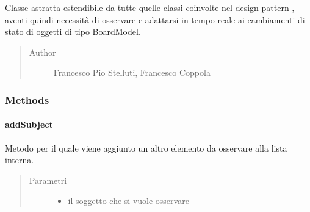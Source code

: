 \documentclass[letterpaper,10pt,italian,openany,oneside]{sphinxmanual}
\begin{document}
\begin{fulllineitems}
\label{\detokenize{source/it/unicam/cs/pa/mastermind/gamecore/BoardObserver:it.unicam.cs.pa.mastermind.gamecore.BoardObserver}}
Classe astratta estendibile da tutte quelle classi coinvolte nel design pattern , aventi quindi necessità di osservare e adattarsi in tempo reale ai cambiamenti di stato di oggetti di tipo BoardModel.
\begin{quote}\begin{description}
\item[{Author}] \leavevmode
Francesco Pio Stelluti, Francesco Coppola

\end{description}\end{quote}

\end{fulllineitems}



\subsubsection{Methods}
\label{\detokenize{source/it/unicam/cs/pa/mastermind/gamecore/BoardObserver:methods}}

\paragraph{addSubject}
\label{\detokenize{source/it/unicam/cs/pa/mastermind/gamecore/BoardObserver:addsubject}}

\begin{fulllineitems}
\label{\detokenize{source/it/unicam/cs/pa/mastermind/gamecore/BoardObserver:it.unicam.cs.pa.mastermind.gamecore.BoardObserver.addSubject(BoardModel)}}
Metodo per il quale viene aggiunto un altro elemento da osservare alla lista interna.
\begin{quote}\begin{description}
\item[{Parametri}] \leavevmode\begin{itemize}
\item {} 
 \textendash{} il soggetto che si vuole osservare

\end{itemize}

\end{description}\end{quote}

\end{fulllineitems}
\end{document}
